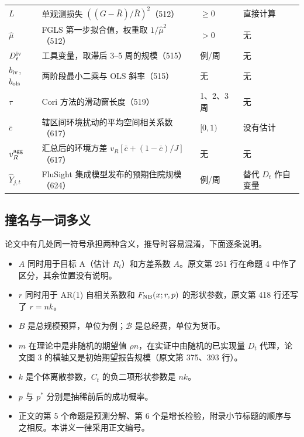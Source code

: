 \begin{table}[!tbp]
\begin{tabular}{L{1.9cm}L{5.8cm}L{2.8cm}L{4.4cm}}
$L$ & 单观测损失 $((G-\bar R)/\bar R)^2$（512） & $\ge0$ & 直接计算 \\
$\hat\mu$ & FGLS 第一步拟合值，权重取 $1/\hat\mu^2$（512） & $>0$ & 无 \\
$D_t^{\rm iv}$ & 工具变量，取滞后 3--5 周的规模（515） & 例/周 & 无 \\
$b_{\rm iv}$, $b_{\rm ols}$ & 两阶段最小二乘与 OLS 斜率（515） & 无 & 无 \\
$\tau$ & Cori 方法的滑动窗长度（519） & 1、2、3 周 & 无 \\
$\bar c$ & 辖区间环境扰动的平均空间相关系数（617） & $[0,1)$ & 没有估计 \\
$v_R^{\rm agg}$ & 汇总后的环境方差 $v_R[\bar c+(1-\bar c)/J]$（617） & 无 & 无 \\
$\widehat Y_{j,t}$ & FluSight 集成模型发布的预期住院规模（624） & 例/周 & 替代 $D_t$ 作自变量 \\
\bottomrule
\end{tabular}
\end{table}

\subsection{撞名与一词多义}

论文中有几处同一符号承担两种含义，推导时容易混淆，下面逐条说明。

\begin{itemize}
\item $A$ 同时用于目标 A（估计 $R_t$）和方差系数 $A$。原文第 251 行在命题 4 中作了区分，其余位置没有说明。
\item $r$ 同时用于 AR(1) 自相关系数和 $F_{\rm NB}(x;r,p)$ 的形状参数，原文第 418 行还写了 $r=nk$。
\item $B$ 是总规模预算，单位为例；$\mathcal B$ 是总经费，单位为货币。
\item $m$ 在理论中是非随机的期望值 $\rho n$，在实证中由随机的已实现量 $D_t$ 代理，论文图 3 的横轴又是初始期望报告规模（原文第 375、393 行）。
\item $k$ 是个体离散参数，$C_t$ 的负二项形状参数是 $nk$。
\item $p$ 与 $p^*$ 分别是抽稀前后的成功概率。
\item 正文的第 5 个命题是预测分解、第 6 个是增长检验，附录小节标题的顺序与之相反。本讲义一律采用正文编号。
\end{itemize}
